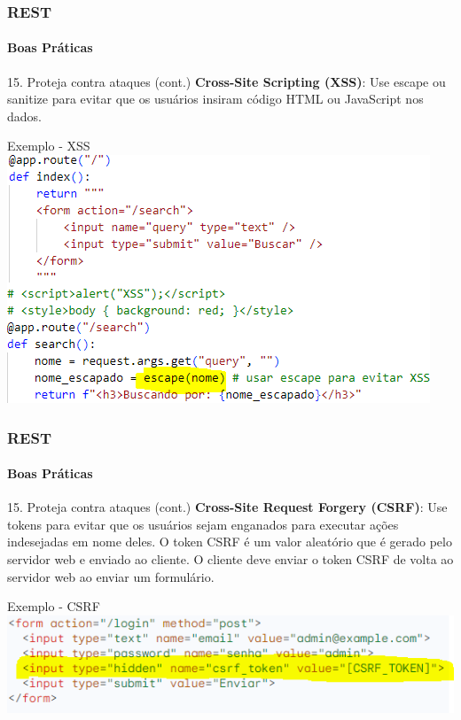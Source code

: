 \documentclass[
	10pt, %
	t, %
]{beamer}
\newcommand{\yellowbox}[1]{\colorbox{yellow!75}{#1}}
\begin{document}
\begin{frame}
	\frametitle{REST}
	\framesubtitle{Boas Práticas}

	\begin{block}{15. Proteja contra ataques (cont.)}
		\textbf{Cross-Site Scripting (XSS)}: Use \yellowbox{escape} ou \yellowbox{sanitize} para evitar que os usuários insiram código HTML ou JavaScript nos dados.
	\end{block}

	\begin{exampleblock}{Exemplo - XSS}
		\includegraphics[width=0.6\linewidth]{xss_example.png}
	\end{exampleblock}

\end{frame}

\begin{frame}
	\frametitle{REST}
	\framesubtitle{Boas Práticas}

	\begin{block}{15. Proteja contra ataques (cont.)}
		\textbf{Cross-Site Request Forgery (CSRF)}: Use \yellowbox{tokens} para evitar que os usuários sejam enganados para executar ações indesejadas em nome deles. O token CSRF é um valor aleatório que é gerado pelo servidor web e enviado ao cliente. O cliente deve enviar o token CSRF de volta ao servidor web ao enviar um formulário.
	\end{block}

	\begin{exampleblock}{Exemplo - CSRF}
		\includegraphics[width=0.9\linewidth]{csrf_example.png}
	\end{exampleblock}

\end{frame}
\end{document}
